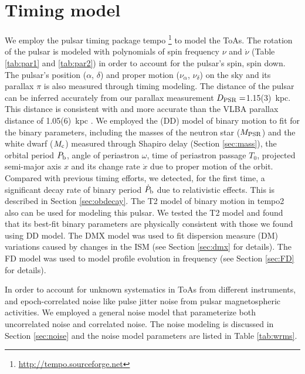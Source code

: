 \section{Timing model}
\label{sec:model}
We employ the pulsar timing package {\sc tempo}
\footnote{\url{http://tempo.sourceforge.net}} to model the ToAs. 
The rotation of the pulsar is modeled with polynomials of spin frequency 
$\nu$ and $\dot{\nu}$ (Table \ref{tab:par1} and \ref{tab:par2}) in order to account
for the pulsar's spin, spin down.
The pulsar's position ($\alpha$, $\delta$) and proper motion ($\nu_\alpha$, $
\nu_\delta$) on the sky and its parallax $\pi$ is also measured through timing modeling. 
The distance of the pulsar can be inferred accurately from our parallax
measurement $D_{\rm PSR}=$1.15(3)~kpc. This distance is consistent with and
more accurate than the VLBA parallax distance of 1.05(6)~kpc \citep{cbv+09}.
We employed the \citet{dd86} (DD) model of binary motion to fit for the binary parameters, 
including the masses of
the neutron star ($M_{\rm PSR}$) and the white dwarf ($M_{\rm c}$) measured
through Shapiro delay (Section \ref{sec:mass}),
the orbital period $P_{\rm b}$, angle of periastron $\omega$, time of
periastron passage $T_0$, projected semi-major axis $x$ and its change rate
$\dot{x}$ due to proper motion of the orbit. 
Compared with previous timing efforts, we detected, for the first time, a
significant decay rate of binary period $\dot{P}_{\rm b}$ due to relativistic
effects. This is described in Section \ref{sec:obdecay}.    
The T2 model of binary motion in {\sc tempo2} \citep{hem06} also can be used for modeling this pulsar. We tested the T2 model and found that its best-fit binary parameters are physically consistent with those we found using DD model.
The DMX model was used to fit dispersion measure (DM) variations caused by changes in the ISM (see Section \ref{sec:dmx} for details). The FD model was used to model profile
evolution in frequency (see Section \ref{sec:FD} for details). 

In order to account for unknown systematics in ToAs from different
instruments, and epoch-correlated noise like pulse jitter noise from pulsar
magnetospheric activities. 
We employed a general noise model that parameterize both uncorrelated noise and
correlated noise. The noise modeling is discussed in Section \ref{sec:noise} and the
noise model parameters are listed in Table \ref{tab:wrms}. 

